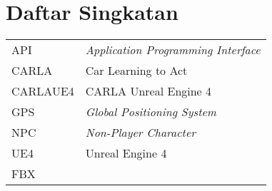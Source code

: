 \chapter*{Daftar Singkatan}

\begingroup
\def\arraystretch{1.25}
\begin{tabular}{p{4cm}l}
	API & \textit{Application Programming Interface} \\
	CARLA & Car Learning to Act \\
	CARLAUE4 & CARLA Unreal Engine 4 \\
	GPS & \textit{Global Positioning System} \\
	NPC & \textit{Non-Player Character} \\
	UE4 & Unreal Engine 4 \\

	FBX &  \\

\end{tabular}
\endgroup
\clearpage
